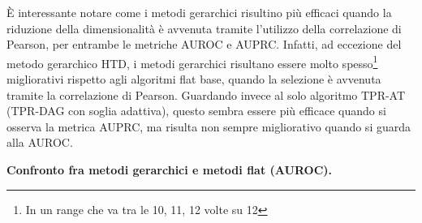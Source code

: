 \documentclass[12pt]{report}
\begin{document}
\newline
\newline
È interessante notare come i metodi gerarchici risultino più efficaci quando la riduzione della dimensionalità è avvenuta tramite l'utilizzo della correlazione di Pearson, per entrambe le metriche AUROC e AUPRC. Infatti, ad eccezione del metodo gerarchico HTD, i metodi gerarchici risultano essere molto spesso\footnote{\footnotesize{In un range che va tra le 10, 11, 12 volte su 12}} migliorativi rispetto agli algoritmi flat base, quando la selezione è avvenuta tramite la correlazione di Pearson. Guardando invece al solo algoritmo TPR-AT (TPR-DAG con soglia adattiva), questo sembra essere più efficace quando si osserva la metrica AUPRC, ma risulta non sempre migliorativo quando si guarda alla AUROC.

\begin{table}[h!]
\hspace*{0.6in}
\caption*{\textbf{Confronto fra metodi gerarchici e metodi flat (AUROC).}}
\hspace*{0.6in}
\hspace*{0.6in}
\end{table}
\end{document}
